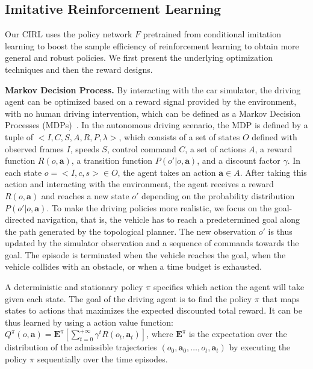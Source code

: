 \documentclass[runningheads]{llncs}
\begin{document}
\subsection{Imitative Reinforcement Learning}

Our CIRL uses the policy network $F$ pretrained from conditional imitation learning to boost the sample efficiency of reinforcement learning to obtain more general and robust policies. We first present the underlying optimization techniques and then the reward designs.

\noindent\textbf{Markov Decision Process.} By interacting with the car simulator, the driving agent can be optimized based on a reward signal provided by the environment, with no human driving intervention, which can be defined as a Markov Decision Processes (MDPs)~\cite{sutton1998introduction}. In the autonomous driving scenario, the MDP is defined by a tuple of $<I,C,S,A,R,P, \lambda>$, which consists of a set of states $O$ defined with observed frames $I$, speeds $S$, control command $C$, a set of actions $A$, a reward function $R(o,\mathbf{a})$, a transition function
$P(o'|o, \mathbf{a})$, and a discount factor $\gamma$. In each state $o = <I, c, s>\in O$, the agent takes an action $\mathbf{a}\in A$. After taking this action and interacting with the environment, the agent receives a reward $R(o,\mathbf{a})$ and reaches a new state $o'$ depending on the probability distribution $P(o'|o, \mathbf{a})$. To make the driving policies more realistic, we focus on the goal-directed navigation, that is, the vehicle has to reach a predetermined goal along the path generated by the topological planner. The new observation $o'$ is thus updated by the simulator observation and a sequence of commands towards the goal. The episode is terminated when the vehicle reaches the goal, when the vehicle collides with an obstacle, or when a time budget is exhausted.

A deterministic and stationary policy $\pi$ specifies which action the agent will take given each state. The goal of the driving agent is to find the policy $\pi$ that maps states to actions that maximizes the expected discounted total reward. It can be thus learned by using a action value function: $Q^\pi(o,\mathbf{a}) = \mathbf{E}^\pi[\sum_{t=0}^{+\infty}\gamma^tR(o_t, \mathbf{a}_t)]$, where $\mathbf{E}^\pi$ is the expectation over the distribution of the admissible trajectories $(o_0, \mathbf{a}_0, \dots, o_t, \mathbf{a}_t)$ by executing the policy $\pi$ sequentially over the time episodes.
\end{document}
